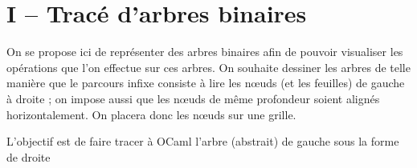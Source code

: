 \chapter{I -- Tracé d'arbres binaires}
\thispagestyle{empty}
{\sf 
On se propose ici de représenter des arbres binaires afin de pouvoir visualiser les opérations que l'on effectue sur ces arbres. On souhaite  dessiner les arbres de telle manière que le parcours infixe consiste à lire les nœuds (et les feuilles) de gauche à droite ; on impose aussi que les nœuds de même profondeur soient alignés horizontalement. On placera donc les nœuds sur une grille.
}

\medskip

L'objectif est de faire tracer à OCaml l'arbre (abstrait) de gauche sous la forme de droite

